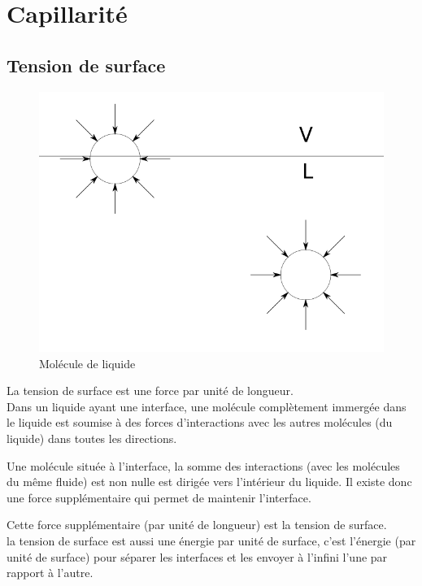 \chapter{Capillarité}\label{ch:capillaire}

\section{Tension de surface}
\begin{figure}[ht]
	\centering
	\includegraphics[scale = 0.3]{./gfx/rondforces.png}
	\caption{Molécule de liquide}
\end{figure}

La tension de surface est une force par unité de longueur.\\ 

Dans un liquide ayant une interface, une molécule complètement immergée dans le liquide est soumise à des forces d'interactions avec les autres molécules (du liquide) dans toutes les directions. 

Une molécule située à l'interface, la somme des interactions (avec les molécules du même fluide) est non nulle est dirigée vers l'intérieur du liquide. Il existe donc une force supplémentaire qui permet de maintenir l'interface.

Cette force supplémentaire (par unité de longueur) est la tension de surface.\\



la tension de surface est aussi une énergie par unité de surface, c'est l'énergie (par unité de surface) pour séparer les interfaces et les envoyer à l'infini l'une par rapport à l'autre.


